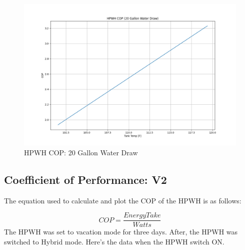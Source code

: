 \begin{figure}[htp!]
    \centering
    \includegraphics[width=1.1\columnwidth]{Pictures/cop_sim.png}
    \caption{HPWH COP: 20 Gallon Water Draw}
    \label{fig:cop}
\end{figure}
\newpage
\subsection{Coefficient of Performance: V2}
The equation used to calculate and plot the COP of the HPWH is as follows:

\begin{equation}
    COP = \frac{EnergyTake}{Watts}
\end{equation}
The HPWH was set to vacation mode for three days. After, the HPWH was switched to Hybrid mode. Here's the data when the HPWH switch ON.

